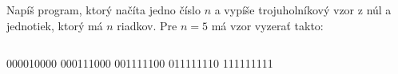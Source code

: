 \begin{column}{0.5}
\begin{uloha}
  Napíš program, ktorý načíta jedno číslo $n$ a vypíše trojuholníkový vzor z núl 
  a jednotiek, ktorý má $n$ riadkov. Pre $n=5$ má vzor vyzerať takto:
\end{uloha}
\end{column}
\hfill
\begin{column}{0.2}
\vspace*{-2ex}
\begin{outputBox}
000010000
000111000
001111100
011111110
111111111
\end{outputBox}
\end{column}
